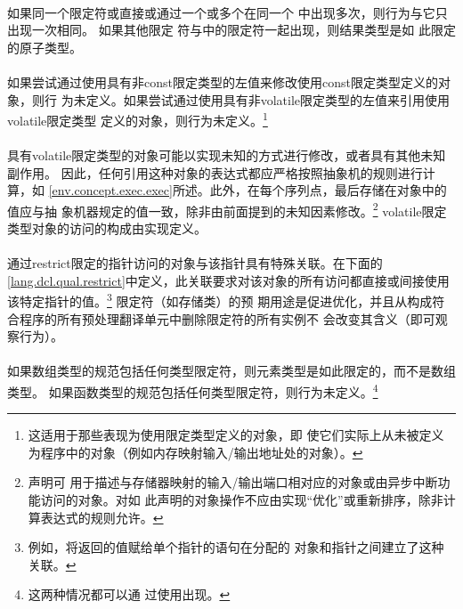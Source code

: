 {\paragraph{}
如果同一个限定符或直接或通过一个或多个在同一个
中出现多次，则行为与它只出现一次相同。 如果其他限定
符与中的限定符一起出现，则结果类型是如
此限定的原子类型。

\paragraph{}
如果尝试通过使用具有非const限定类型的左值来修改使用const限定类型定义的对象，则行
为未定义。如果尝试通过使用具有非volatile限定类型的左值来引用使用volatile限定类型
定义的对象，则行为未定义。\footnote{这适用于那些表现为使用限定类型定义的对象，即
使它们实际上从未被定义为程序中的对象（例如内存映射输入/输出地址处的对象）。}

\paragraph{}
具有volatile限定类型的对象可能以实现未知的方式进行修改，或者具有其他未知副作用。
因此，任何引用这种对象的表达式都应严格按照抽象机的规则进行计算，如
\ref{env.concept.exec.exec}所述。此外，在每个序列点，最后存储在对象中的值应与抽
象机器规定的值一致，除非由前面提到的未知因素修改。\footnote{声明可
用于描述与存储器映射的输入/输出端口相对应的对象或由异步中断功能访问的对象。对如
此声明的对象操作不应由实现``优化''或重新排序，除非计算表达式的规则允许。}
volatile限定类型对象的访问的构成由实现定义。

\paragraph{}
通过restrict限定的指针访问的对象与该指针具有特殊关联。在下面的
\ref{lang.dcl.qual.restrict}中定义，此关联要求对该对象的所有访问都直接或间接使用
该特定指针的值。\footnote{例如，将返回的值赋给单个指针的语句在分配的
对象和指针之间建立了这种关联。} 限定符（如存储类）的预
期用途是促进优化，并且从构成符合程序的所有预处理翻译单元中删除限定符的所有实例不
会改变其含义（即可观察行为）。

\paragraph{}
如果数组类型的规范包括任何类型限定符，则元素类型是如此限定的，而不是数组类型。 
如果函数类型的规范包括任何类型限定符，则行为未定义。\footnote{这两种情况都可以通
过使用出现。}

}
